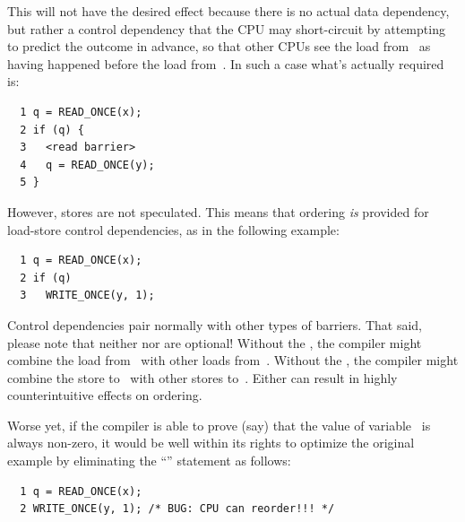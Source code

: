 This will not have the desired effect because there is no actual data
dependency, but rather a control dependency that the CPU may short-circuit
by attempting to predict the outcome in advance, so that other CPUs see
the load from~ as having happened before the load from~.
In such a case what's actually required is:

\vspace{5pt}
\begin{minipage}[t]{\columnwidth}
\scriptsize
\begin{verbatim}
  1 q = READ_ONCE(x);
  2 if (q) {
  3   <read barrier>
  4   q = READ_ONCE(y);
  5 }
\end{verbatim}
\end{minipage}
\vspace{5pt}

However, stores are not speculated.
This means that ordering \emph{is} provided for load-store control
dependencies, as in the following example:

\vspace{5pt}
\begin{minipage}[t]{\columnwidth}
\scriptsize
\begin{verbatim}
  1 q = READ_ONCE(x);
  2 if (q)
  3   WRITE_ONCE(y, 1);
\end{verbatim}
\end{minipage}
\vspace{5pt}

Control dependencies pair normally with other types of barriers.
That said, please note that neither  nor 
are optional!
Without the , the compiler might combine the load
from~ with other loads from~.
Without the , the compiler might combine the store
to~ with other stores to~.
Either can result in highly counterintuitive effects on ordering.

Worse yet, if the compiler is able to prove (say) that the value of
variable~ is always non-zero, it would be well within its rights
to optimize the original example by eliminating the ``'' statement
as follows:

\vspace{5pt}
\begin{minipage}[t]{\columnwidth}
\scriptsize
\begin{verbatim}
  1 q = READ_ONCE(x);
  2 WRITE_ONCE(y, 1); /* BUG: CPU can reorder!!! */
\end{verbatim}
\end{minipage}
\vspace{5pt}

